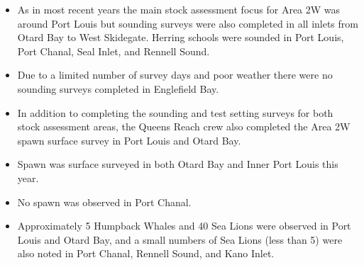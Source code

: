 \begin{itemize}

\item As in most recent years the main stock assessment focus for Area 2W
was around Port Louis but sounding surveys were also completed
in all inlets from Otard Bay to West Skidegate.
Herring schools were sounded in
Port Louis, Port Chanal, Seal Inlet, and Rennell Sound.

\item Due to a limited number of survey days and poor weather
there were no sounding surveys completed in Englefield Bay.

\item In addition to completing the sounding and test setting surveys
for both stock assessment areas,
the Queens Reach crew also completed
the Area 2W spawn surface survey in Port Louis and Otard Bay.

\item Spawn was surface surveyed in both
Otard Bay and Inner Port Louis this year.

\item No spawn was observed in Port Chanal.

\item Approximately 5 Humpback Whales and 40 Sea Lions
were observed in Port Louis and Otard Bay, and a
small numbers of Sea Lions (less than 5) were also noted in
Port Chanal, Rennell Sound, and Kano Inlet.

\end{itemize}